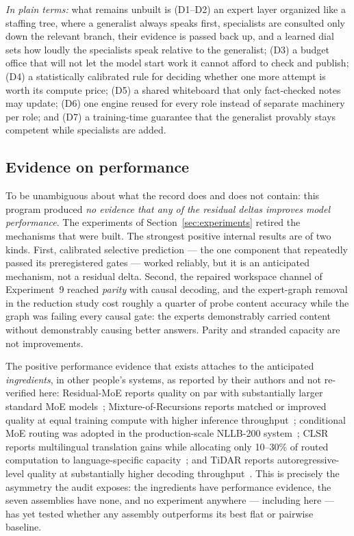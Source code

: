 \documentclass[10pt,a4paper]{article}
\begin{document}
\emph{In plain terms:} what remains unbuilt is (D1--D2) an expert layer
organized like a staffing tree, where a generalist always speaks first,
specialists are consulted only down the relevant branch, their evidence is
passed back up, and a learned dial sets how loudly the specialists speak
relative to the generalist; (D3) a budget office that will not let the model
start work it cannot afford to check and publish; (D4) a statistically
calibrated rule for deciding whether one more attempt is worth its compute
price; (D5) a shared whiteboard that only fact-checked notes may update;
(D6) one engine reused for every role instead of separate machinery per
role; and (D7) a training-time guarantee that the generalist provably stays
competent while specialists are added.

\subsection{Evidence on performance}

To be unambiguous about what the record does and does not contain: this
program produced \emph{no evidence that any of the residual deltas improves
model performance}. The experiments of Section~\ref{sec:experiments} retired
the mechanisms that were built. The strongest positive internal results are
of two kinds. First, calibrated selective prediction --- the one component
that repeatedly passed its preregistered gates --- worked reliably, but it is
an anticipated mechanism, not a residual delta. Second, the repaired
workspace channel of Experiment~9 reached \emph{parity} with causal
decoding, and the expert-graph removal in the reduction study cost roughly a
quarter of probe content accuracy while the graph was failing every causal
gate: the experts demonstrably carried content without demonstrably causing
better answers. Parity and stranded capacity are not improvements.

The positive performance evidence that exists attaches to the anticipated
\emph{ingredients}, in other people's systems, as reported by their authors
and not re-verified here: Residual-MoE reports quality on par with
substantially larger standard MoE models~\cite{rajbhandari2022};
Mixture-of-Recursions reports matched or improved quality at equal training
compute with higher inference throughput~\cite{mor2025}; conditional MoE
routing was adopted in the production-scale NLLB-200 system~\cite{nllb2022};
CLSR reports multilingual translation gains while allocating only 10--30\%
of routed computation to language-specific capacity~\cite{zhang2021clsr};
and TiDAR reports autoregressive-level quality at substantially higher
decoding throughput~\cite{tidar2025}. This is precisely the asymmetry the
audit exposes: the ingredients have performance evidence, the seven
assemblies have none, and no experiment anywhere --- including here --- has
yet tested whether any assembly outperforms its best flat or pairwise
baseline.
\end{document}

